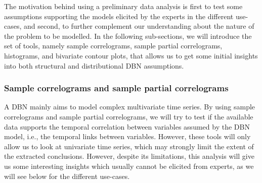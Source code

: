 The motivation behind using a preliminary data analysis is first to test some assumptions supporting the models elicited by the experts in the different use-cases, and second, to further complement our understanding about the nature of the problem to be modelled. In the following sub-sections, we will introduce the set of tools, namely sample correlograms, sample partial correlograms, histograms, and bivariate contour plots, that allows us to get some initial insights into both structural and distributional DBN assumptions.

\subsubsection{Sample correlograms and sample partial correlograms}

A DBN mainly aims to model complex multivariate time series. By using sample correlograms and sample partial correlograms, we will try to test if the available data supports the temporal correlation between variables assumed by the DBN model, i.e., the temporal links between variables. However, these tools will only allow us to look at univariate time series, which may strongly limit the extent of the extracted conclusions. However, despite its limitations, this analysis will give us some interesting insights which usually cannot be elicited from experts, as we will see below for the different use-cases.  

